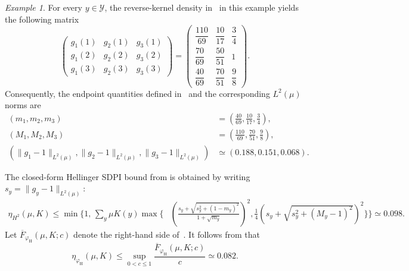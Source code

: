 \documentclass[11pt]{article}
\theoremstyle{plain}
\theoremstyle{remark}
\newtheorem{example}{Example}
\begin{document}
\begin{example}
For every $y\in\mathcal Y$, the reverse-kernel density in~ in this example yields the following matrix
\begin{equation}
    \begin{pmatrix}
        g_1(1) & g_2(1) & g_3(1)\\
        g_1(2) & g_2(2) & g_3(2)\\
        g_1(3) & g_2(3) & g_3(3)
    \end{pmatrix}
    =
    \begin{pmatrix}
        \dfrac{110}{69} & \dfrac{10}{17} & \dfrac{3}{4}\\[1mm]
        \dfrac{70}{69}  & \dfrac{50}{51} & 1\\[1mm]
        \dfrac{40}{69}  & \dfrac{70}{51} & \dfrac{9}{8}
    \end{pmatrix}.
\end{equation}
Consequently, the endpoint quantities defined in~ and the corresponding $L^2(\mu)$ norms are
\begin{align}
    (m_1,m_2,m_3)
    &=
    \left(
        \frac{40}{69},
        \frac{10}{17},
        \frac{3}{4}
    \right),\\
    (M_1,M_2,M_3)
    &=
    \left(
        \frac{110}{69},
        \frac{70}{51},
        \frac{9}{8}
    \right),\\
    (\lVert g_1-1\rVert_{L^2(\mu)},\lVert g_2-1\rVert_{L^2(\mu)},\lVert g_3-1\rVert_{L^2(\mu)})
    &\simeq
    (0.188,0.151,0.068).
\end{align}

The closed-form Hellinger SDPI bound from
 is
obtained by writing $s_y=\lVert g_y-1\rVert_{L^2(\mu)}$:
\begin{align}
    \eta_{H^2}(\mu,K)
    \leq
    \min\Bigg\{
    1,\,
    \sum_y \mu K(y)
    \max\Bigg\{&
        \left(
        \frac{
            s_y+\sqrt{s_y^2+(1-m_y)^2}
        }{
            1+\sqrt{m_y}
        }
        \right)^2,
        \frac{1}{4}
        \left(
            s_y+\sqrt{s_y^2+(M_y-1)^2}
        \right)^2
    \Bigg\}
    \Bigg\} \simeq
    0.098    .
\end{align}
Let $\overline F_{\varphi_{\mathrm H}}(\mu,K;c)$ denote the right-hand side of~. It follows from  that
\begin{equation}
    \eta_{\varphi_{\mathrm H}}(\mu,K)
    \leq
    \sup_{0<c\leq1}
    \frac{
        \overline F_{\varphi_{\mathrm H}}(\mu,K;c)
    }{c} \simeq
    0.082.
\end{equation}


\end{example}
\end{document}
